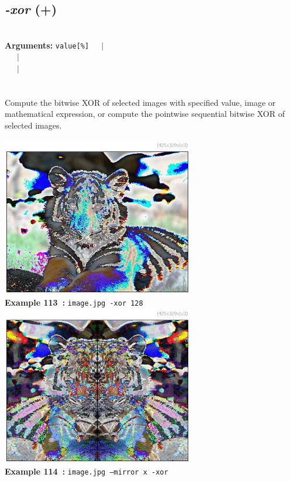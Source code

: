 \documentclass[a4paper,11pt,twoside]{book}
\begin{document}
\subsection{\emph{-xor} (+)}\vspace*{-0.5em}
~\\\textbf{Arguments: } 
{\small \texttt{value[\%]}}~~~$|$\\
\hspace*{2.2cm}{\small \texttt{[image]}}~~~$|$\\
~~~$|$\\
\\~\\
Compute the bitwise XOR of selected images with specified value, image or mathematical
expression, or compute the pointwise sequential bitwise XOR of selected images.
\begin{center}\includegraphics[keepaspectratio=true,height=7cm,width=\textwidth]{img/gmic_def113.jpg}\\
{\footnotesize \textbf{Example 113~:} \texttt{image.jpg -xor 128}}
\\\includegraphics[keepaspectratio=true,height=7cm,width=\textwidth]{img/gmic_def114.jpg}\\
{\footnotesize \textbf{Example 114~:} \texttt{image.jpg --mirror x -xor}}
\end{center}
\end{document}
